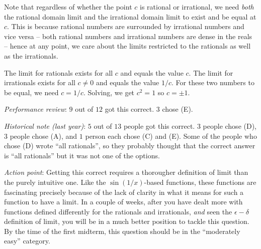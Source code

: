 \documentclass[10pt]{amsart}
\begin{document}
\begin{enumerate}
  Note that regardless of whether the point $c$ is rational or
  irrational, we need {\em both} the rational domain limit and the
  irrational domain limit to exist and be equal at $c$. This is
  because rational numbers are surrounded by irrational numbers and
  vice versa -- both rational numbers and irrational numbers are dense
  in the reals -- hence at any point, we care about the limits
  restricted to the rationals as well as the irrationals.

  The limit for rationals exists for all $c$ and equals the value
  $c$. The limit for irrationals exists for all $c \ne 0$ and equals
  the value $1/c$. For these two numbers to be equal, we need $c =
  1/c$. Solving, we get $c^2 = 1$ so $c = \pm 1$.

  {\em Performance review}: $9$ out of $12$ got this correct. $3$
  chose (E).

  {\em Historical note (last year)}: $5$ out of $13$ people got this correct. $3$
  people chose (D), $3$ people chose (A), and $1$ person each chose
  (C) and (E). Some of the people who chose (D) wrote ``all
  rationals'', so they probably thought that the correct answer is
  ``all rationals'' but it was not one of the options.

  {\em Action point}: Getting this correct requires a thorougher
  definition of limit than the purely intuitive one. Like the
  $\sin(1/x)$-based functions, these functions are fascinating
  precisely because of the lack of clarity in what it means for such a
  function to have a limit. In a couple of weeks, after you have dealt
  more with functions defined differently for the rationals and
  irrationals, {\em and} seen the $\epsilon-\delta$ definition of
  limit, you will be in a much better position to tackle this
  question. By the time of the first midterm, this question should be
  in the ``moderately easy'' category.
\end{enumerate}
\end{document}
